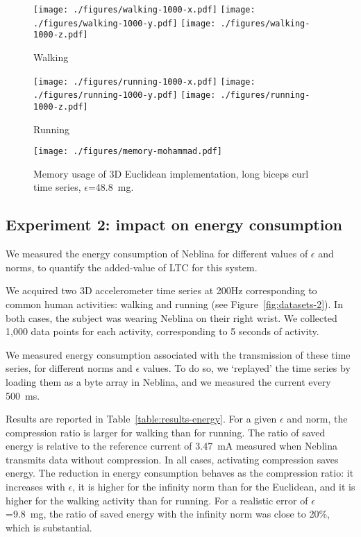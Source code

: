 \documentclass[10pt, conference, compsocconf]{IEEEtran}
\begin{document}
\begin{figure*}
\begin{subfigure}{2\columnwidth}
\texttt{[image: ./figures/walking-1000-x.pdf]}
\texttt{[image: ./figures/walking-1000-y.pdf]}
\texttt{[image: ./figures/walking-1000-z.pdf]}
\caption{Walking}
\end{subfigure}
\begin{subfigure}{2\columnwidth}
\texttt{[image: ./figures/running-1000-x.pdf]}
\texttt{[image: ./figures/running-1000-y.pdf]}
\texttt{[image: ./figures/running-1000-z.pdf]}
\caption{Running}
\end{subfigure}
\caption{Time series used in Experiment 2}
\label{fig:datasets-2}
\end{figure*}

\begin{figure}
\texttt{[image: ./figures/memory-mohammad.pdf]}
\caption{Memory usage of 3D Euclidean implementation, long biceps curl time series, $\epsilon$=48.8~mg.}
\label{fig:memory}
\end{figure}

\subsection{Experiment 2: impact on energy consumption}

We measured the energy consumption of Neblina
for different values of $\epsilon$ and norms, to quantify the
added-value of LTC for this system.

We acquired two 3D accelerometer time series at 200Hz corresponding to
common human activities: walking and running (see Figure~\ref{fig:datasets-2}). In both cases, the
subject was wearing Neblina on their right wrist.
We collected 1,000 data points for each activity, corresponding to
5 seconds of activity.

We measured energy consumption associated with the transmission of
these time series, for different norms and $\epsilon$ values. To do so,
we `replayed' the time series by loading them as a byte array in
Neblina, and we measured the current every 500~ms.

 Results are reported in Table~\ref{table:results-energy}. For a given
 $\epsilon$ and norm, the compression ratio is larger for walking than
 for running. The ratio of saved energy is relative to the reference
 current of 3.47~mA measured when Neblina transmits data without
 compression. In all cases, activating compression saves energy. The
 reduction in energy consumption behaves as the compression ratio: it
 increases with $\epsilon$,
it is higher for the infinity norm than for the Euclidean, and it is
higher for the walking activity than for running. For a realistic error
of $\epsilon$=9.8~mg, the ratio of saved energy with the infinity norm was
close to 20\%, which is substantial.
\end{document}

